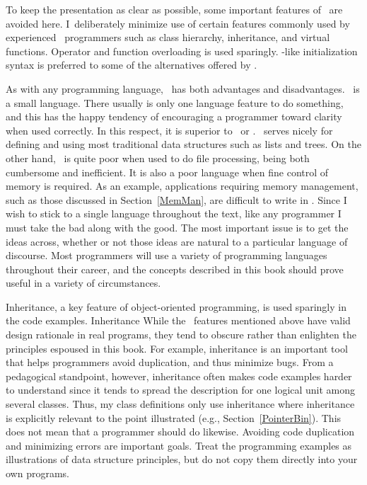 {To keep the presentation as clear as possible, some
important features of \Lang\ are avoided here.
I~deliberately minimize use of certain features commonly
used by experienced \Lang\ programmers such as
class hierarchy,
inheritance, and
virtual functions.
Operator and function overloading
is used sparingly.
\C-like initialization syntax is preferred to some of the
alternatives offered by \Lang.}{}

{As with any programming language, \Lang\ has both
advantages and disadvantages.
\Lang\ is a small language.
There usually is only one language feature to do something,
and this has the happy tendency of encouraging a programmer toward
clarity when used correctly.
In this respect, it is superior to \C\ or \LangCPP.
\LangJava\ serves nicely for defining and using most traditional data
structures such as lists and trees.
On the other hand, \Lang\ is quite poor when used to do file
processing, being both cumbersome and inefficient.
It is also a poor language when fine control of memory is required.
As an example, applications requiring memory
management, such as those discussed in Section~\ref{MemMan}, are
difficult to write in \Lang.
Since I wish to stick to a single language throughout the text, like
any programmer I must take the bad along with the good.
The most important issue is to get the ideas across, whether or not
those ideas are natural to a particular language of discourse.
Most programmers will use a variety of programming languages
throughout their career, and the concepts described in this book
should prove useful in a variety of circumstances.}{}

{Inheritance, a key feature of object-oriented programming, is used
sparingly in the code examples.
Inheritance}{}
{While the \Lang\ features mentioned above have valid design rationale
in real programs, they tend to obscure rather than enlighten the
principles espoused in this book.
For example, inheritance}{}
is an important tool that helps programmers avoid
duplication, and thus minimize bugs.
From a pedagogical standpoint, however, inheritance often makes
code examples harder to understand since it tends to spread the
description for one logical unit among several classes.
Thus, my class definitions only use inheritance where inheritance is
explicitly relevant to the point illustrated
(e.g., Section~\ref{PointerBin}).
This does not mean that a programmer should do likewise.
Avoiding code duplication and minimizing errors are important goals.
Treat the programming examples as illustrations of data structure
principles, but do not copy them directly into your own programs.

